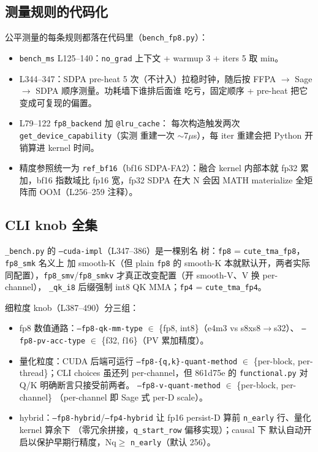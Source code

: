 \subsection{测量规则的代码化}

公平测量的每条规则都落在代码里（\texttt{bench\_fp8.py}）：
\begin{itemize}[itemsep=0pt,topsep=2pt]
  \item \texttt{bench\_ms} L125--140：\texttt{no\_grad} 上下文 +
        warmup 3 + iters 5 取 min。
  \item L344--347：SDPA pre-heat 5 次（不计入）拉稳时钟，随后按
        FFPA $\to$ Sage $\to$ SDPA 顺序测量。功耗墙下谁排后面谁
        吃亏，固定顺序 + pre-heat 把它变成可复现的偏置。

  \item L79--122 \texttt{fp8\_backend} 加 \texttt{@lru\_cache}：
        每次构造触发两次 \texttt{get\_device\_capability}（实测
        重建一次 $\sim$7$\mu$s），每 iter 重建会把 Python 开销算进
        kernel 时间。
  \item 精度参照统一为 \texttt{ref\_bf16}（bf16 SDPA-FA2）：融合
        kernel 内部本就 fp32 累加，bf16 指数域比 fp16 宽，fp32 SDPA
        在大 N 会因 MATH materialize 全矩阵而 OOM（L256--259 注释）。
\end{itemize}

\subsection{CLI knob 全集}

\texttt{\_bench.py} 的 \texttt{--cuda-impl}（L347--386）是一棵别名
树：\texttt{fp8} = \texttt{cute\_tma\_fp8}，\texttt{fp8\_smk} 名义上
加 smooth-K（但 plain \texttt{fp8} 的 smooth-K 本就默认开，两者实际
同配置），\texttt{fp8\_smv}/\texttt{fp8\_smkv} 才真正改变配置（开
smooth-V、V 换 per-channel），
\texttt{\_qk\_i8} 后缀强制 int8 QK MMA；\texttt{fp4} =
\texttt{cute\_tma\_fp4}。

细粒度 knob（L387--490）分三组：

\begin{itemize}[itemsep=0pt,topsep=2pt]
  \item fp8 数值通路：\texttt{--fp8-qk-mm-type} $\in$
        \{fp8, int8\}（e4m3 vs s8xs8$\to$s32）、
        \texttt{--fp8-pv-acc-type} $\in$ \{f32, f16\}（PV 累加精度）。
  \item 量化粒度：CUDA 后端可运行 \texttt{--fp8-\{q,k\}-quant-method} $\in$
        \{per-block, per-thread\}；CLI choices 虽还列 per-channel，但 861d75e 的
        \texttt{functional.py} 对 Q/K 明确断言只接受前两者。
        \texttt{--fp8-v-quant-method} $\in$ \{per-block, per-channel\}
        （per-channel 即 Sage 式 per-D scale）。
  \item hybrid：\texttt{--fp8-hybrid}/\texttt{--fp4-hybrid} 让 fp16
        persist-D 算前 \texttt{n\_early} 行、量化 kernel 算余下
        （零冗余拼接，\texttt{q\_start\_row} 偏移实现）；causal 下
        默认自动开启以保护早期行精度，Nq$\ge$
        \texttt{n\_early}（默认 256）。
\end{itemize}

